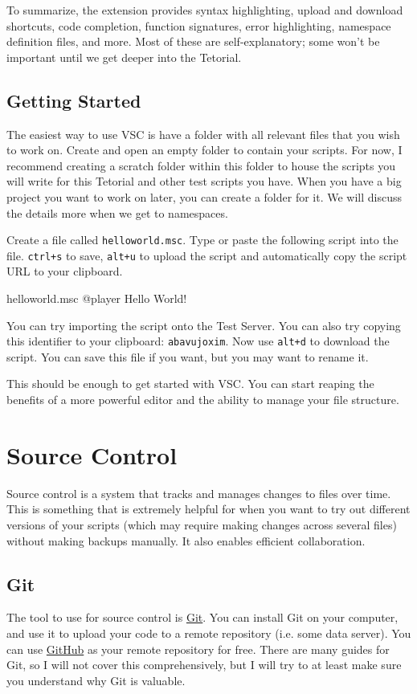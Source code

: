 \documentclass[oneside]{book}
\begin{document}
To summarize, the extension provides syntax highlighting, upload and download shortcuts, code completion, function signatures, error highlighting, namespace definition files, and more. Most of these are self-explanatory; some won't be important until we get deeper into the Tetorial.

\subsection{Getting Started}
The easiest way to use VSC is have a folder with all relevant files that you wish to work on. Create and open an empty folder to contain your scripts. For now, I recommend creating a scratch folder within this folder to house the scripts you will write for this Tetorial and other test scripts you have. When you have a big project you want to work on later, you can create a folder for it. We will discuss the details more when we get to namespaces.

Create a file called \texttt{helloworld.msc}. Type or paste the following script into the file. \texttt{ctrl+s} to save, \texttt{alt+u} to upload the script and automatically copy the script URL to your clipboard.

\begin{msccode}{helloworld.msc}
@player Hello World!
\end{msccode}

You can try importing the script onto the Test Server. You can also try copying this identifier to your clipboard: \texttt{abavujoxim}. Now use \texttt{alt+d} to download the script. You can save this file if you want, but you may want to rename it.

This should be enough to get started with VSC. You can start reaping the benefits of a more powerful editor and the ability to manage your file structure.

\section{Source Control}
Source control is a system that tracks and manages changes to files over time. This is something that is extremely helpful for when you want to try out different versions of your scripts (which may require making changes across several files) without making backups manually. It also enables efficient collaboration.

\subsection{Git}
The tool to use for source control is \href{https://git-scm.com/}{Git}. You can install Git on your computer, and use it to upload your code to a remote repository (i.e. some data server). You can use \href{https://github.com}{GitHub} as your remote repository for free. There are many guides for Git, so I will not cover this comprehensively, but I will try to at least make sure you understand why Git is valuable.
\end{document}

